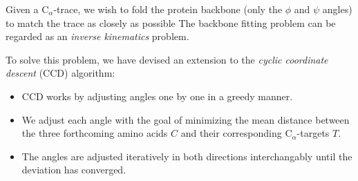 \documentclass[a0,portrait]{a0poster}
\newcommand{\Ca}{C$_{\alpha}${}}
\begin{document}
\begin{GridBlock}{0}{72.3}{49}
\begin{multicols}{2}

Given a \Ca-trace, we wish to fold the protein backbone (only the $\phi$ and $\psi$ angles) to match the trace as closely as possible
The backbone fitting problem can be regarded as an \emph{inverse kinematics} problem.




To solve this problem, we have devised an extension to the \emph{cyclic coordinate descent} (CCD) algorithm:
\begin{itemize}
	\item CCD works by adjusting angles one by one in a greedy manner.
	\item We adjust each angle with the goal of minimizing the mean distance between the three forthcoming amino acids $C$ and their corresponding \Ca-targets $T$.
	\item The angles are adjusted iteratively in both directions interchangably until the deviation has converged.
\end{itemize}


\end{multicols}
\end{GridBlock}
\end{document}
